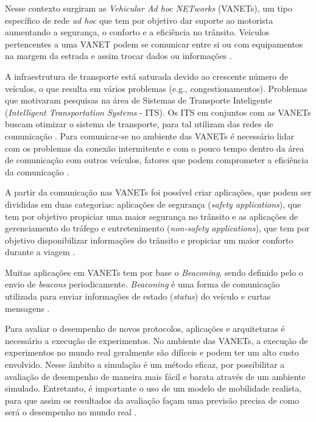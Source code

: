 \documentclass[mestrado, pre-defesa, english, brazil]{packages/icmc}
\begin{document}
Nesse contexto surgiram as \textit{Vehicular Ad hoc NETworks} (VANETs), um tipo específico de rede \textit{ad hoc} que tem por objetivo dar suporte ao motorista aumentando a segurança, o conforto e a eficiência no trânsito. Veículos pertencentes a uma VANET podem se comunicar entre si ou com equipamentos na margem da estrada e assim trocar dados ou informações \cite{chen-2010}.

A infraestrutura de transporte está saturada devido ao crescente número de veículos, o que resulta em vários problemas (e.g., congestionamentos). Problemas que motivaram pesquisas na área de Sistemas de Transporte Inteligente (\textit{Intelligent Transportation Systems} - ITS). Os ITS em conjuntos com as VANETs buscam otimizar o sistema de transporte, para tal utilizam das redes de comunicação \cite{Figueiredo-2001}. Para comunicar-se no ambiente das VANETs é necessário lidar com os problemas da conexão intermitente e com o pouco tempo dentro da área de comunicação com outros veículos, fatores que podem comprometer a eficiência da comunicação \cite{Rubinstein-2009}.

A partir da comunicação nas VANETs foi possível criar aplicações, que podem ser divididas em duas categorias: aplicações de segurança (\textit{safety applications}), que tem por objetivo propiciar uma maior segurança no trânsito e as aplicações de gerenciamento do tráfego e entretenimento (\textit{non-safety applications}), que tem por objetivo disponibilizar informações do trânsito e propiciar um maior conforto durante a viagem \cite{Soomro-2010}.

Muitas aplicações em VANETs tem por base o \textit{Beaconing}, sendo definido pelo o envio de \textit{beacons} periodicamente. \textit{Beaconing} é uma forma de comunicação utilizada para enviar informações de estado (\textit{status}) do veículo e curtas mensagens \cite{noori-2013,Nguyen-2002}.

Para avaliar o desempenho de novos protocolos, aplicações e arquiteturas é necessário a execução de experimentos. No ambiente das VANETs, a execução de experimentos no mundo real geralmente são difíceis e podem ter um alto custo envolvido. Nesse âmbito a simulação é um método eficaz, por possibilitar a avaliação de desempenho de maneira mais fácil e barata através de um ambiente simulado. Entretanto, é importante o uso de um modelo de mobilidade realista, para que assim os resultados da avaliação façam uma previsão precisa de como será o desempenho no mundo real \cite{Mahajan-2006,Saha-2004}.
\end{document}
